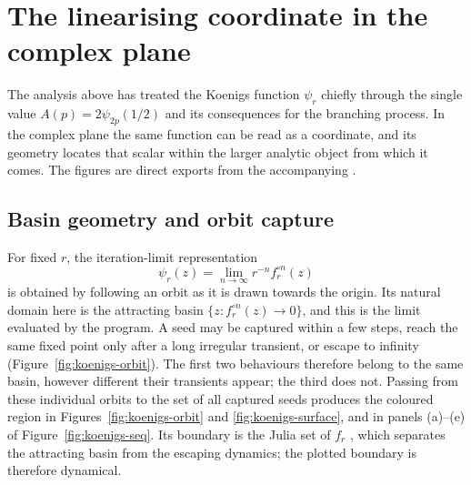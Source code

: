 
\section{The linearising coordinate in the complex plane}
\label{sec:koenigsvisual}

The analysis above has treated the Koenigs function $\psi_r$ chiefly through
the single value $A(p)=2\psi_{2p}(1/2)$ and its consequences for the branching
process. In the complex plane the same function can be read as a coordinate,
and its geometry locates that scalar within the larger analytic object from
which it comes. The figures are direct exports from the accompanying
.

\subsection{Basin geometry and orbit capture}

For fixed $r$, the iteration-limit representation
\[
\psi_r(z)=\lim_{n\to\infty}r^{-n}f_r^{\circ n}(z)
\]
is obtained by following an orbit as it is drawn towards the origin. Its natural
domain here is the attracting basin $\{z:f_r^{\circ n}(z)\to0\}$, and this is
the limit evaluated by the program. A seed may be captured within a few steps, reach the
same fixed point only after a long irregular transient, or escape to infinity
(Figure~\ref{fig:koenigs-orbit}). The first two behaviours therefore belong to
the same basin, however different their transients appear; the third does not.
Passing from these individual orbits to the set of all captured seeds produces
the coloured region in Figures~\ref{fig:koenigs-orbit} and
\ref{fig:koenigs-surface}, and in panels (a)--(e) of
Figure~\ref{fig:koenigs-seq}. Its boundary is the Julia set of $f_r$
\cite{Milnor2006}, which separates the attracting basin from the escaping
dynamics; the plotted boundary is therefore dynamical.

